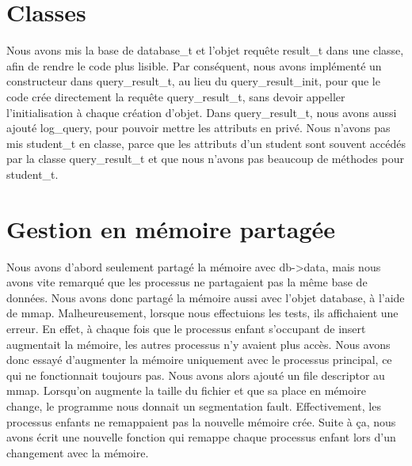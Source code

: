 \documentclass[utf8]{article}
\begin{document}
\section{Classes}
\indent{}
\par
Nous avons mis la base de database\_t et l'objet requête result\_t dans une classe, afin de rendre le code plus lisible. Par conséquent,
nous avons implémenté un constructeur dans query\_result\_t, au lieu du query\_result\_init, pour que le code
crée directement la requête query\_result\_t, sans devoir appeller l'initialisation à chaque création d'objet.
Dans query\_result\_t, nous avons aussi ajouté log\_query, pour pouvoir mettre les attributs en privé.
Nous n'avons pas mis student\_t en classe, parce que les attributs d'un student sont souvent accédés par la classe query\_result\_t
et que nous n'avons pas beaucoup de méthodes pour student\_t.
\par

\section{Gestion en mémoire partagée}
\indent{}
\par
Nous avons d'abord seulement partagé la mémoire avec db->data, mais nous avons vite remarqué que les processus
ne partagaient pas la même base de données. Nous avons donc partagé la mémoire aussi avec l'objet database, à l'aide de mmap.
Malheureusement, lorsque nous effectuions les tests, ils affichaient une erreur. En effet, à chaque fois que le processus enfant
s'occupant de insert augmentait la mémoire, les autres processus n'y avaient plus accès. Nous avons donc essayé d'augmenter la mémoire 
uniquement avec le processus principal, ce qui ne fonctionnait toujours pas. Nous avons alors ajouté un file descriptor au mmap.
Lorsqu'on augmente la taille du fichier et que sa place en mémoire change, le programme nous donnait un segmentation fault.
Effectivement, les processus enfants ne remappaient pas la nouvelle mémoire crée. Suite à ça, nous avons écrit une nouvelle fonction
qui remappe chaque processus enfant lors d'un changement avec la mémoire.
\par
\end{document}
